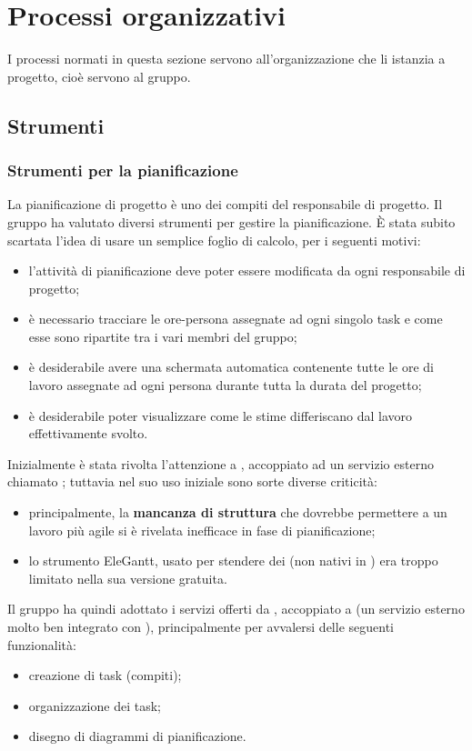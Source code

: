 
\section{Processi organizzativi} \label{sec:organizzativi}
I processi normati in questa sezione servono all'organizzazione che li istanzia a progetto, cioè servono al gruppo.



\subsection{Strumenti}

\subsubsection{Strumenti per la pianificazione}
La pianificazione di progetto è uno dei compiti del responsabile di progetto. Il gruppo ha valutato diversi strumenti per gestire la pianificazione. È stata subito scartata l'idea di usare un semplice foglio di calcolo, per i seguenti motivi:
\begin{itemize}
	\item l'attività di pianificazione deve poter essere modificata da ogni responsabile di progetto;
	\item è necessario tracciare le ore-persona assegnate ad ogni singolo task e come esse sono ripartite tra i vari membri del gruppo;
	\item è desiderabile avere una schermata automatica contenente tutte le ore di lavoro assegnate ad ogni persona durante tutta la durata del progetto;
	\item è desiderabile poter visualizzare come le stime differiscano dal lavoro effettivamente svolto.
\end{itemize}
Inizialmente è stata rivolta l'attenzione a , accoppiato ad un servizio esterno chiamato ; tuttavia nel suo uso iniziale sono sorte diverse criticità:
\begin{itemize}
	\item principalmente, la \textbf{mancanza di struttura} che dovrebbe permettere a  un lavoro più agile si è rivelata inefficace in fase di pianificazione;
	\item lo strumento EleGantt, usato per stendere dei  (non nativi in ) era troppo limitato nella sua versione gratuita.
\end{itemize}
Il gruppo ha quindi adottato i servizi offerti da , accoppiato a  (un servizio esterno molto ben integrato con ), principalmente per avvalersi delle seguenti funzionalità:
\begin{itemize}
	\item creazione di task (compiti);
	\item organizzazione dei task;
	\item disegno di diagrammi di pianificazione.
\end{itemize}
